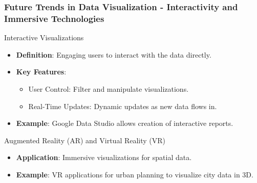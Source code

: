 \documentclass[aspectratio=169]{beamer}
\begin{document}
\begin{frame}[fragile]
    \frametitle{Future Trends in Data Visualization - Interactivity and Immersive Technologies}
    \begin{block}{Interactive Visualizations}
        \begin{itemize}
            \item \textbf{Definition}: Engaging users to interact with the data directly.
            \item \textbf{Key Features}:
                \begin{itemize}
                    \item User Control: Filter and manipulate visualizations.
                    \item Real-Time Updates: Dynamic updates as new data flows in.
                \end{itemize}
            \item \textbf{Example}: Google Data Studio allows creation of interactive reports.
        \end{itemize}
    \end{block}
    
    \begin{block}{Augmented Reality (AR) and Virtual Reality (VR)}
        \begin{itemize}
            \item \textbf{Application}: Immersive visualizations for spatial data.
            \item \textbf{Example}: VR applications for urban planning to visualize city data in 3D.
        \end{itemize}
    \end{block}
\end{frame}
\end{document}
